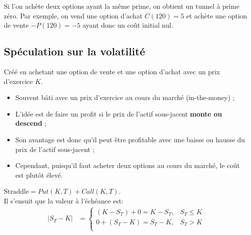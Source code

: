 \documentclass[10pt, french]{article}
\begin{document}
\begin{multicols*}{2}
\begin{definitionNOHFILL}
Si l'on achète deux options ayant la même prime, on obtient un tunnel à prime zéro. Par exemple, on vend une option d'achat $C(120) = 5$ et achète une option de vente $-P(120) = -5$ ayant donc un coût initial nul.
\end{definitionNOHFILL}

\columnbreak
\subsection{Spéculation sur la volatilité}
\begin{definitionNOHFILL}
Créé en achetant une option de vente et une option d'achat avec un prix d'exercice $K$.

\begin{distributions}[Contexte]
\begin{itemize}
	\item	Souvent bâti avec un prix d'exercice au cours du marché (in-the-money) ;
	\item	L'idée est de faire un profit si le prix de l'actif sous-jacent \textbf{monte ou descend} ;
	\item	Son avantage est donc qu'il peut être profitable avec une baisse ou hausse du prix de l'actif sous-jacent ;
	\item	Cependant, puisqu'il faut acheter deux options au cours du marché, le coût est plutôt élevé.
\end{itemize}
\end{distributions}

$\text{Straddle} = Put(K, T) + Call(K, T)$.\\

Il s'ensuit que la valeur à l'échéance est:
\begin{align*}
	|S_{T} - K|	
	&=	
		\begin{cases}
		(K - S_{T})	+	0	=	K - S_{T},	&	S_{T} \le K	\\
		0	+	(S_{T} - K)	=	S_{T} - K,	&	S_{T} >	K	\\
		\end{cases}
\end{align*}

\begin{center}
\begin{tikzpicture}[x=0.75pt,y=0.75pt,yscale=-1,xscale=1]


\end{tikzpicture}
\end{center}
\end{definitionNOHFILL}
\end{multicols*}
\end{document}
